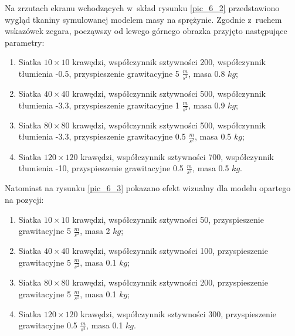 		Na zrzutach ekranu wchodzących w~skład rysunku \ref{pic_6_2} przedstawiono wygląd tkaniny symulowanej modelem masy na sprężynie. Zgodnie z~ruchem wskazówek zegara, począwszy od lewego górnego obrazka przyjęto następujące parametry:
		
		\begin{enumerate}
			\item Siatka \(10 \times 10\) krawędzi, współczynnik sztywności 200, współczynnik tłumienia -0.5, przyspieszenie grawitacyjne 5 \( \frac{m}{s^2} \), masa 0.8 \(kg\);
			\item Siatka \(40 \times 40\) krawędzi, współczynnik sztywności 500, współczynnik tłumienia -3.3, przyspieszenie grawitacyjne 1 \( \frac{m}{s^2} \), masa 0.9 \(kg\);
			\item Siatka \(80 \times 80\) krawędzi, współczynnik sztywności 500, współczynnik tłumienia -3.3, przyspieszenie grawitacyjne 0.5 \( \frac{m}{s^2} \), masa 0.5 \(kg\);
			\item Siatka \(120 \times 120\) krawędzi, współczynnik sztywności 700, współczynnik tłumienia -10, przyspieszenie grawitacyjne 0.5 \( \frac{m}{s^2} \), masa 0.5 \(kg\).
		\end{enumerate}
		
		Natomiast na rysunku \ref{pic_6_3} pokazano efekt wizualny dla modelu opartego na pozycji:
		
		\begin{enumerate}
			\item Siatka \(10 \times 10\) krawędzi, współczynnik sztywności 50, przyspieszenie grawitacyjne 5 \( \frac{m}{s^2} \), masa 2 \(kg\);
			\item Siatka \(40 \times 40\) krawędzi, współczynnik sztywności 100, przyspieszenie grawitacyjne 5 \( \frac{m}{s^2} \), masa 0.1 \(kg\);
			\item Siatka \(80 \times 80\) krawędzi, współczynnik sztywności 200, przyspieszenie grawitacyjne 5 \( \frac{m}{s^2} \), masa 0.1 \(kg\);
			\item Siatka \(120 \times 120\) krawędzi, współczynnik sztywności 300, przyspieszenie grawitacyjne 0.5 \( \frac{m}{s^2} \), masa 0.1 \(kg\).
		\end{enumerate}
		\newpage
			
		
		\pagebreak
		
